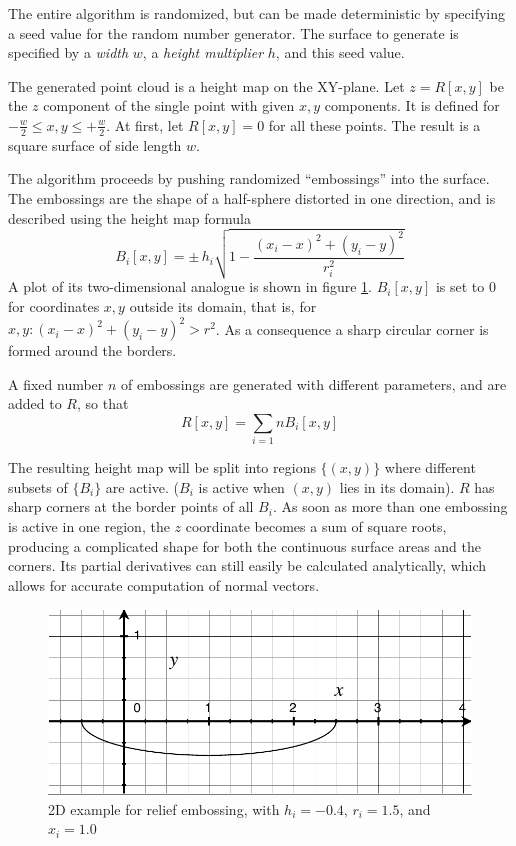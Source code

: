 The entire algorithm is randomized, but can be made deterministic by specifying a seed value for the random number generator. The surface to generate is specified by a \emph{width} $w$, a \emph{height multiplier} $h$, and this seed value.

The generated point cloud is a height map on the XY-plane. Let $z = R[x,y]$ be the $z$ component of the single point with given $x, y$ components. It is defined for $-\frac{w}{2} \leq x,y \leq +\frac{w}{2}$. At first, let $R[x,y] = 0$ for all these points. The result is a square surface of side length $w$.

The algorithm proceeds by pushing randomized ``embossings'' into the surface. The embossings are the shape of a half-sphere distorted in one direction, and is described using the height map formula
\begin{equation}
B_i[x,y] = \pm \, h_i \sqrt{1 - \frac{(x_i - x)^2 + (y_i - y)^2}{r_i^2}}
\end{equation}
A plot of its two-dimensional analogue is shown in figure \ref{fig:relief_B}. $B_i[x,y]$ is set to $0$ for coordinates $x,y$ outside its domain, that is, for $x,y : (x_i - x)^2 + (y_i - y)^2 > r^2$. As a consequence a sharp circular corner is formed around the borders.

A fixed number $n$ of embossings are generated with different parameters, and are added to $R$, so that
\begin{equation}
R[x,y] = \sum_{i=1}{n} B_i[x,y]
\end{equation}

The resulting height map will be split into regions $\{(x,y)\}$ where different subsets of $\{B_i\}$ are active. ($B_i$ is active when $(x,y)$ lies in its domain). $R$ has sharp corners at the border points of all $B_i$. As soon as more than one embossing is active in one region, the $z$ coordinate becomes a sum of square roots, producing a complicated shape for both the continuous surface areas and the corners. Its partial derivatives can still easily be calculated analytically, which allows for accurate computation of normal vectors. 

\begin{figure}[h]
\centering
\includegraphics[width=.5\textwidth]{fig/relief_B.pdf}
\caption{2D example for relief embossing, with $h_i = -0.4$, $r_i = 1.5$, and $x_i = 1.0$}
\label{fig:relief_B}
\end{figure}


